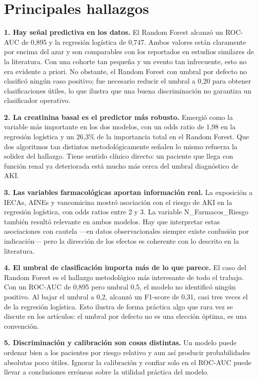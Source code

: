 \documentclass[12pt, a4paper, oneside]{report}
\begin{document}
\section{Principales hallazgos}

\textbf{1. Hay señal predictiva en los datos.} El Random Forest alcanzó un ROC-AUC de 0,895 y la regresión logística de 0,747. Ambos valores están claramente por encima del azar y son comparables con los reportados en estudios similares de la literatura. Con una cohorte tan pequeña y un evento tan infrecuente, esto no era evidente a priori. No obstante, el Random Forest con umbral por defecto no clasificó ningún caso positivo; fue necesario reducir el umbral a 0,20 para obtener clasificaciones útiles, lo que ilustra que una buena discriminación no garantiza un clasificador operativo.

\textbf{2. La creatinina basal es el predictor más robusto.} Emergió como la variable más importante en los dos modelos, con un odds ratio de 1,98 en la regresión logística y un 26,3\% de la importancia total en el Random Forest. Que dos algoritmos tan distintos metodológicamente señalen lo mismo refuerza la solidez del hallazgo. Tiene sentido clínico directo: un paciente que llega con función renal ya deteriorada está mucho más cerca del umbral diagnóstico de AKI.

\textbf{3. Las variables farmacológicas aportan información real.} La exposición a IECAs, AINEs y vancomicina mostró asociación con el riesgo de AKI en la regresión logística, con odds ratios entre 2 y 3. La variable N\_Farmacos\_Riesgo también resultó relevante en ambos modelos. Hay que interpretar estas asociaciones con cautela —en datos observacionales siempre existe confusión por indicación— pero la dirección de los efectos es coherente con lo descrito en la literatura.

\textbf{4. El umbral de clasificación importa más de lo que parece.} El caso del Random Forest es el hallazgo metodológico más interesante de todo el trabajo. Con un ROC-AUC de 0,895 pero umbral 0,5, el modelo no identificó ningún positivo. Al bajar el umbral a 0,2, alcanzó un F1-score de 0,31, casi tres veces el de la regresión logística. Esto ilustra de forma práctica algo que rara vez se discute en los artículos: el umbral por defecto no es una elección óptima, es una convención.

\textbf{5. Discriminación y calibración son cosas distintas.} Un modelo puede ordenar bien a los pacientes por riesgo relativo y aun así producir probabilidades absolutas poco útiles. Ignorar la calibración y confiar solo en el ROC-AUC puede llevar a conclusiones erróneas sobre la utilidad práctica del modelo.
\end{document}
